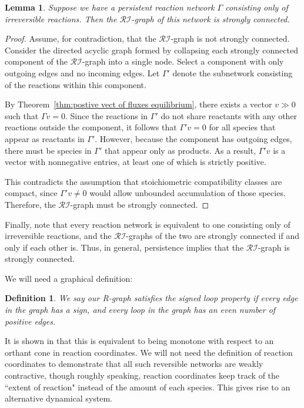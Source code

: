 \documentclass{article}
\newtheorem{lem}{Lemma}
\newtheorem{define}{Definition}
\begin{document}
\begin{lem}
Suppose we have a persistent reaction network \( \Gamma \) consisting only of irreversible reactions. Then the \( \mathcal{RI} \)-graph of this network is strongly connected.
\end{lem}

\begin{proof}
Assume, for contradiction, that the \( \mathcal{RI} \)-graph is not strongly connected. Consider the directed acyclic graph formed by collapsing each strongly connected component of the \( \mathcal{RI} \)-graph into a single node. Select a component with only outgoing edges and no incoming edges. Let \( \Gamma' \) denote the subnetwork consisting of the reactions within this component.

By Theorem~\ref{thm:postive vect of fluxes equilibrium}, there exists a vector \( v \gg 0 \) such that \( \Gamma v = 0 \). Since the reactions in \( \Gamma' \) do not share reactants with any other reactions outside the component, it follows that \( \Gamma' v = 0 \) for all species that appear as reactants in \( \Gamma' \). However, because the component has outgoing edges, there must be species in \( \Gamma' \) that appear only as products. As a result, \( \Gamma' v \) is a vector with nonnegative entries, at least one of which is strictly positive.

This contradicts the assumption that stoichiometric compatibility classes are compact, since \( \Gamma' v \neq 0 \) would allow unbounded accumulation of those species. Therefore, the \( \mathcal{RI} \)-graph must be strongly connected.
\end{proof}

Finally, note that every reaction network is equivalent to one consisting only of irreversible reactions, and the \( \mathcal{RI} \)-graphs of the two are strongly connected if and only if each other is. Thus, in general, persistence implies that the \( \mathcal{RI} \)-graph is strongly connected.



We will need a graphical definition:

\begin{define}
    We say our R-graph satisfies the \textit{signed loop} property if every edge in the graph has a sign, and every loop in the graph has an even number of positive edges.
\end{define}

It is shown in \cite{Angeli2010-hj} that this is equivalent to being monotone with respect to an orthant cone in reaction coordinates. We will not need the definition of reaction coordinates to demonstrate that all such reversible networks are weakly contractive, though roughly speaking, reaction coordinates keep track of the ``extent of reaction" instead of the amount of each species. This gives rise to an alternative dynamical system. 
\end{document}

